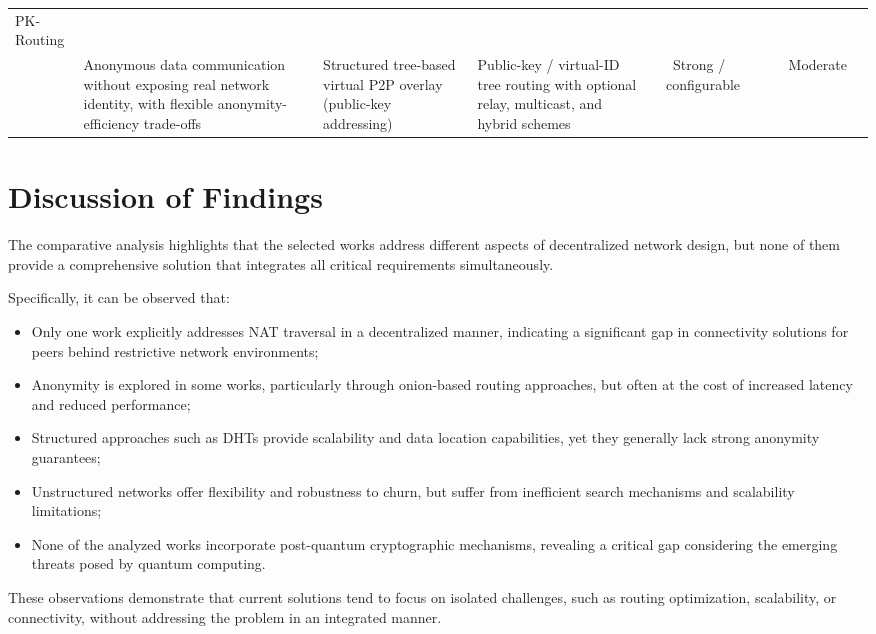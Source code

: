 \documentclass[
  12pt,
  oneside,
  a4paper,
  chapter=TITLE,
  section=TITLE,
  english,
  brazil
]{abntex2}
\newcommand{\statusyes}{\textcolor{green!50!black}{\ding{51}}}
\newcommand{\statusno}{\textcolor{red!70!black}{\ding{55}}}
\newcommand{\statuspositive}[1]{\statusyes~#1}
\newcommand{\statuspartial}[1]{\textcolor{orange!85!black}{\ding{108}}~#1}
\begin{document}
\begin{table}[H]
{\begin{tabular}{L{3cm}L{3cm}L{2.5cm}L{2.5cm}L{2cm}L{2cm}L{2cm}L{2cm}L{2cm}}
PK-Routing\\\cite{mirzaei2018pk} &
Anonymous data communication without exposing real network identity, with flexible anonymity-efficiency trade-offs & 
Structured tree-based virtual P2P overlay (public-key addressing) & 
Public-key / virtual-ID tree routing with optional relay, multicast, and hybrid schemes & 
\statusno & 
\statuspositive{Strong / configurable} & 
\statusno & 
\statuspartial{Moderate} & 
\statusno \\

\bottomrule
\end{tabular}
}

\end{table}

\section{Discussion of Findings}

The comparative analysis highlights that the selected works address different aspects of decentralized network design, but none of them provide a comprehensive solution that integrates all critical requirements simultaneously.

Specifically, it can be observed that:
\begin{itemize}
    \item Only one work explicitly addresses NAT traversal in a decentralized manner, indicating a significant gap in connectivity solutions for peers behind restrictive network environments;
    \item Anonymity is explored in some works, particularly through onion-based routing approaches, but often at the cost of increased latency and reduced performance;
    \item Structured approaches such as DHTs provide scalability and data location capabilities, yet they generally lack strong anonymity guarantees;
    \item Unstructured networks offer flexibility and robustness to churn, but suffer from inefficient search mechanisms and scalability limitations;
    \item None of the analyzed works incorporate post-quantum cryptographic mechanisms, revealing a critical gap considering the emerging threats posed by quantum computing.
\end{itemize}

These observations demonstrate that current solutions tend to focus on isolated challenges, such as routing optimization, scalability, or connectivity, without addressing the problem in an integrated manner.
\end{document}
